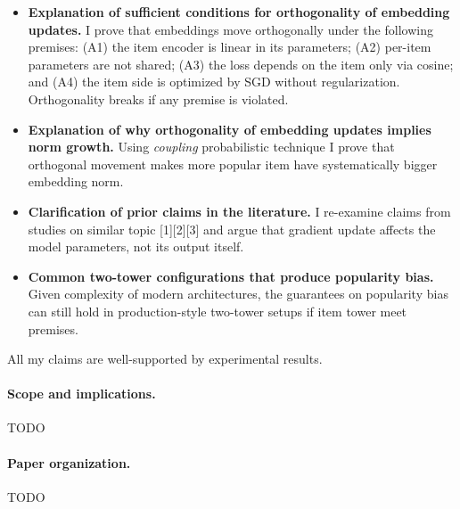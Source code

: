 \begin{itemize}
    \item \textbf{Explanation of sufficient conditions for orthogonality of embedding updates.} I prove that embeddings move orthogonally under the following premises: (A1) the item encoder is linear in its parameters; (A2) per-item parameters are not shared; (A3) the loss depends on the item only via cosine; and (A4) the item side is optimized by SGD without regularization. Orthogonality breaks if any premise is violated.
    \item \textbf{Explanation of why orthogonality of embedding updates implies norm growth.} Using \emph{coupling} probabilistic technique I prove that orthogonal movement makes more popular item have systematically bigger embedding norm.  
    \item \textbf{Clarification of prior claims in the literature.} I re-examine claims from studies on similar topic [1][2][3] and argue that gradient update affects the model parameters, not its output itself.
    \item \textbf{Common two-tower configurations that produce popularity bias.} Given complexity of modern architectures, the guarantees on popularity bias can still hold in production-style two-tower setups if item tower meet premises.
\end{itemize}

All my claims are well-supported by experimental results.

\paragraph{Scope and implications.} TODO

\paragraph{Paper organization.} TODO